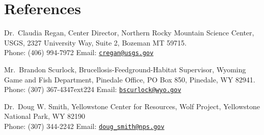 \documentclass[12pt,]{article}
\begin{document}
\hypertarget{references}{%
\section{References}\label{references}}

Dr.~Claudia Regan, Center Director, Northern Rocky Mountain Science
Center, USGS, 2327 University Way, Suite 2, Bozeman MT 59715.\\
Phone: (406) 994-7972 Email:
\href{mailto:cregan@usgs.gov}{\nolinkurl{cregan@usgs.gov}}

Mr.~Brandon Scurlock, Brucellosis-Feedground-Habitat Supervisor, Wyoming
Game and Fish Department, Pinedale Office, PO Box 850, Pinedale, WY
82941.\\
Phone: (307) 367-4347ext224 Email:
\href{mailto:bscurlock@wyo.gov}{\nolinkurl{bscurlock@wyo.gov}}

Dr.~Doug W. Smith, Yellowstone Center for Resources, Wolf Project,
Yellowstone National Park, WY 82190\\
Phone: (307) 344-2242 Email:
\href{mailto:doug_smith@nps.gov}{\nolinkurl{doug\_smith@nps.gov}}
\end{document}
